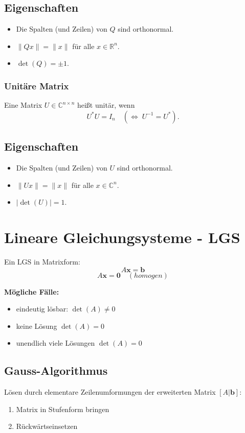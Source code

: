 \documentclass[10pt,a4paper,twocolumn]{article}
\newcommand{\seccol}{black}
\newcommand{\setseccol}[1]{\renewcommand{\seccol}{#1}}
\begin{document}
	\subsection*{Eigenschaften}
	\begin{itemize}
		\item Die Spalten (und Zeilen) von $Q$ sind orthonormal.
		\item $\|Qx\| = \|x\|$ für alle $x \in \mathbb{R}^n$.
		\item $\det(Q) = \pm 1$.
	\end{itemize}
	
	\subsubsection*{Unitäre Matrix}
	
	Eine Matrix $U \in \mathbb{C}^{n\times n}$ heißt unitär, wenn
	\[
	U^{\mathsf *} U = I_n
	\quad (\Leftrightarrow\; U^{-1} = U^{\mathsf *}).
	\]
	
	\subsection*{Eigenschaften}
	\begin{itemize}
		\item Die Spalten (und Zeilen) von $U$ sind orthonormal.
		\item $\|Ux\| = \|x\|$ für alle $x \in \mathbb{C}^n$.
		\item $|\det(U)| = 1$.
	\end{itemize}
	
	\setseccol{c4}
	\section{Lineare Gleichungsysteme - LGS}
	
	Ein LGS in Matrixform:
	\[
	A\mathbf{x}=\mathbf{b}
	\]
	\[
	A\mathbf{x}=\mathbf{0} \quad (homogen)
	\]
	
	\textbf{Mögliche Fälle:}
	\begin{itemize}
		\item eindeutig lösbar: $\det(A)\neq 0$
		\item keine Lösung  $\det(A) = 0$
		\item unendlich viele Lösungen  $\det(A)= 0$
	\end{itemize}
	
	\subsection{Gauss-Algorithmus}
	Lösen durch elementare Zeilenumformungen der erweiterten Matrix $[A|\mathbf{b}]$:
	\begin{enumerate}
		\item Matrix in Stufenform bringen
		\item Rückwärtseinsetzen
	\end{enumerate}
	
\end{document}

